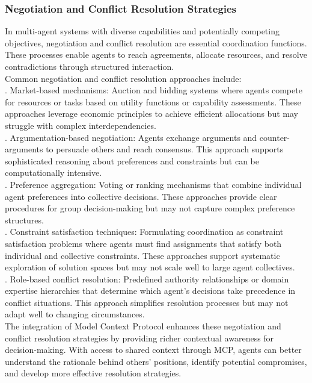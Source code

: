 \subsubsection{Negotiation and Conflict Resolution Strategies}
In multi-agent systems with diverse capabilities and potentially competing objectives, negotiation and conflict resolution are essential coordination functions. These processes enable agents to reach agreements, allocate resources, and resolve contradictions through structured interaction.\\ \newline
Common negotiation and conflict resolution approaches include:\\ . Market-based mechanisms: Auction and bidding systems where agents compete for resources or tasks based on utility functions or capability assessments. These approaches leverage economic principles to achieve efficient allocations but may struggle with complex interdependencies.\\ . Argumentation-based negotiation: Agents exchange arguments and counter-arguments to persuade others and reach consensus. This approach supports sophisticated reasoning about preferences and constraints but can be computationally intensive.\\ . Preference aggregation: Voting or ranking mechanisms that combine individual agent preferences into collective decisions. These approaches provide clear procedures for group decision-making but may not capture complex preference structures.\\ . Constraint satisfaction techniques: Formulating coordination as constraint satisfaction problems where agents must find assignments that satisfy both individual and collective constraints. These approaches support systematic exploration of solution spaces but may not scale well to large agent collectives.\\ . Role-based conflict resolution: Predefined authority relationships or domain expertise hierarchies that determine which agent's decisions take precedence in conflict situations. This approach simplifies resolution processes but may not adapt well to changing circumstances.\\ \newline
The integration of Model Context Protocol enhances these negotiation and conflict resolution strategies by providing richer contextual awareness for decision-making. With access to shared context through MCP, agents can better understand the rationale behind others' positions, identify potential compromises, and develop more effective resolution strategies.\\ \newline
